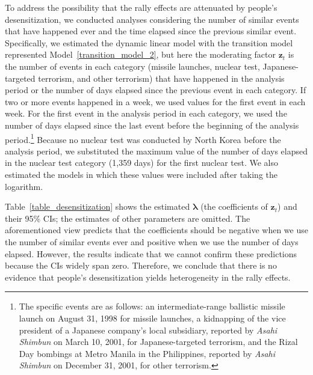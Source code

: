\documentclass[12pt,letterpaper]{scrartcl}
\let\oldfootnote\footnote
\renewcommand\footnote[1]{\oldfootnote{\hspace{2mm}#1}}
\begin{document}
To address the possibility that the rally effects are attenuated by people's desensitization, we conducted analyses considering the number of similar events that have happened ever and the time elapsed since the previous similar event. Specifically, we estimated the dynamic linear model with the transition model represented Model~\eqref{transition_model_2}, but here the moderating factor $\bm{z}_{t}$ is the number of events in each category (missile launches, nuclear test, Japanese-targeted terrorism, and other terrorism) that have happened in the analysis period or the number of days elapsed since the previous event in each category. If two or more events happened in a week, we used values for the first event in each week. For the first event in the analysis period in each category, we used the number of days elapsed since the last event before the beginning of the analysis period.\footnote{The specific events are as follows: an intermediate-range ballistic missile launch on August 31, 1998 for missile launches, a kidnapping of the vice president of a Japanese company's local subsidiary, reported by \textit{Asahi Shimbun} on March 10, 2001, for Japanese-targeted terrorism, and the Rizal Day bombings at Metro Manila in the Philippines, reported by \textit{Asahi Shimbun} on December 31, 2001, for other terrorism.} Because no nuclear test was conducted by North Korea before the analysis period, we substituted the maximum value of the number of days elapsed in the nuclear test category (1,359 days) for the first nuclear test. We also estimated the models in which these values were included after taking the logarithm.

Table~\ref{table_desensitization} shows the estimated $\bm{\lambda}$ (the coefficients of $\bm{z}_{t}$) and their 95\% CIs; the estimates of other parameters are omitted. The aforementioned view predicts that the coefficients should be negative when we use the number of similar events ever and positive when we use the number of days elapsed. However, the results indicate that we cannot confirm these predictions because the CIs widely span zero. Therefore, we conclude that there is no evidence that people's desensitization yields heterogeneity in the rally effects.
\end{document}
